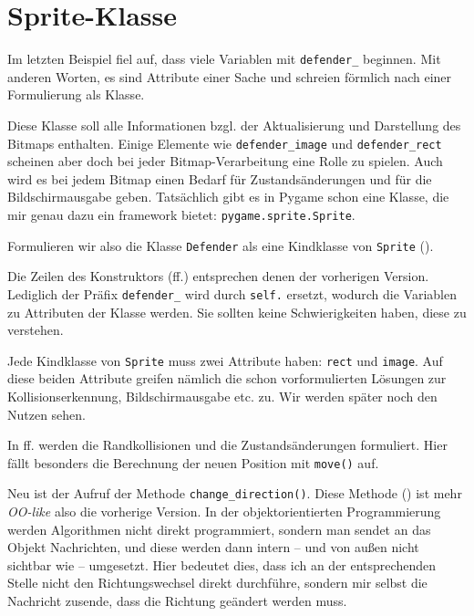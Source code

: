 \newpage
\section{Sprite-Klasse}

Im letzten Beispiel fiel auf, dass viele Variablen mit \texttt{defender\_} beginnen. Mit anderen Worten, es sind Attribute einer Sache und schreien förmlich nach einer Formulierung als Klasse. 

Diese Klasse soll alle Informationen bzgl. der Aktualisierung und Darstellung des Bitmaps enthalten. Einige Elemente wie \texttt{defender\_image} und \texttt{defender\_rect} scheinen aber doch bei jeder Bitmap-Verarbeitung eine Rolle zu spielen. Auch wird es bei jedem Bitmap einen Bedarf für Zustandsänderungen und für die Bildschirmausgabe geben. Tatsächlich gibt es in Pygame schon eine Klasse, die mir genau dazu ein \Gls{framework} bietet: \texttt{pygame.sprite.Sprite}. 

Formulieren wir also die Klasse \texttt{Defender} als eine Kindklasse von \texttt{Sprite} ().


Die Zeilen des Konstruktors (ff.) entsprechen denen der vorherigen Version. Lediglich der Präfix \texttt{defender\_} wird durch \texttt{self.} ersetzt, wodurch die Variablen zu Attributen der Klasse werden. Sie sollten keine Schwierigkeiten haben, diese zu verstehen.

Jede Kindklasse von \texttt{Sprite} muss zwei Attribute haben: \texttt{rect} und \texttt{image}. Auf diese beiden Attribute greifen nämlich die schon vorformulierten Lösungen zur Kollisionserkennung, Bildschirmausgabe etc. zu. Wir werden später noch den Nutzen sehen.

In ff. werden die Randkollisionen und die Zustandsänderungen formuliert. Hier fällt besonders die Berechnung der neuen Position mit \texttt{move()} auf. 

Neu ist der Aufruf der Methode \texttt{change\_direction()}. Diese Methode () ist mehr \emph{OO-like} also die vorherige Version. In der objektorientierten Programmierung werden Algorithmen nicht direkt programmiert, sondern man sendet an das Objekt Nachrichten, und diese werden dann intern -- und von außen nicht sichtbar wie -- umgesetzt. Hier bedeutet dies, dass ich an der entsprechenden Stelle nicht den Richtungswechsel direkt durchführe, sondern mir selbst die Nachricht zusende, dass die Richtung geändert werden muss. 

